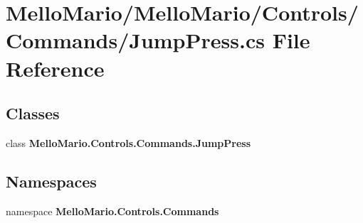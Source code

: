 \section{Mello\+Mario/\+Mello\+Mario/\+Controls/\+Commands/\+Jump\+Press.cs File Reference}
\label{JumpPress_8cs}
\subsection*{Classes}
\begin{DoxyCompactItemize}
\item 
class \textbf{ Mello\+Mario.\+Controls.\+Commands.\+Jump\+Press}
\end{DoxyCompactItemize}
\subsection*{Namespaces}
\begin{DoxyCompactItemize}
\item 
namespace \textbf{ Mello\+Mario.\+Controls.\+Commands}
\end{DoxyCompactItemize}
